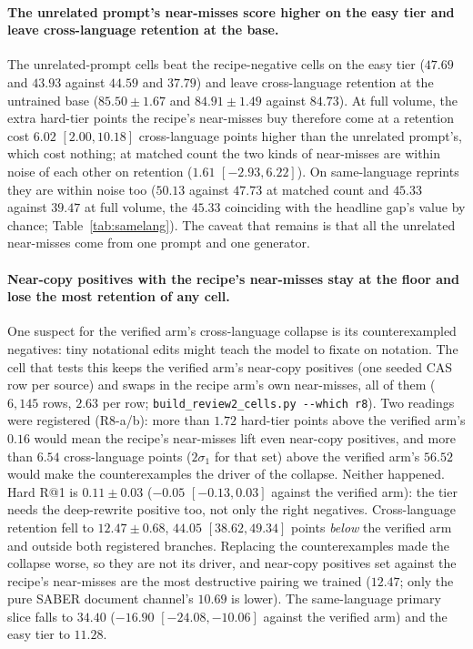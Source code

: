\paragraph{The unrelated prompt's near-misses score higher on the easy tier and leave cross-language retention at the base.}
The unrelated-prompt cells beat the recipe-negative cells on the easy tier ($47.69$ and $43.93$ against $44.59$ and $37.79$) and leave cross-language retention at the untrained base ($85.50 \pm 1.67$ and $84.91 \pm 1.49$ against $84.73$). At full volume, the extra hard-tier points the recipe's near-misses buy therefore come at a retention cost $6.02$ $[2.00, 10.18]$ cross-language points higher than the unrelated prompt's, which cost nothing; at matched count the two kinds of near-misses are within noise of each other on retention ($1.61$ $[-2.93, 6.22]$). On same-language reprints they are within noise too ($50.13$ against $47.73$ at matched count and $45.33$ against $39.47$ at full volume, the $45.33$ coinciding with the headline gap's value by chance; Table~\ref{tab:samelang}). The caveat that remains is that all the unrelated near-misses come from one prompt and one generator.

\paragraph{Near-copy positives with the recipe's near-misses stay at the floor and lose the most retention of any cell.}
One suspect for the verified arm's cross-language collapse is its counterexampled negatives: tiny notational edits might teach the model to fixate on notation. The cell that tests this keeps the verified arm's near-copy positives (one seeded CAS row per source) and swaps in the recipe arm's own near-misses, all of them ($6{,}145$ rows, $2.63$ per row; \texttt{build\_review2\_cells.py -{}-which r8}). Two readings were registered (R8-a/b): more than $1.72$ hard-tier points above the verified arm's $0.16$ would mean the recipe's near-misses lift even near-copy positives, and more than $6.54$ cross-language points ($2\sigma_1$ for that set) above the verified arm's $56.52$ would make the counterexamples the driver of the collapse. Neither happened. Hard R@1 is $0.11 \pm 0.03$ ($-0.05$ $[-0.13, 0.03]$ against the verified arm): the tier needs the deep-rewrite positive too, not only the right negatives. Cross-language retention fell to $12.47 \pm 0.68$, $44.05$ $[38.62, 49.34]$ points \emph{below} the verified arm and outside both registered branches. Replacing the counterexamples made the collapse worse, so they are not its driver, and near-copy positives set against the recipe's near-misses are the most destructive pairing we trained ($12.47$; only the pure SABER document channel's $10.69$ is lower). The same-language primary slice falls to $34.40$ ($-16.90$ $[-24.08, -10.06]$ against the verified arm) and the easy tier to $11.28$.

